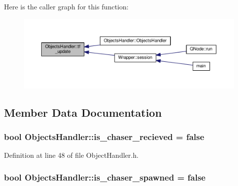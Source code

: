 Here is the caller graph for this function\+:
\nopagebreak
\begin{figure}[H]
\begin{center}
\leavevmode
\includegraphics[width=350pt]{class_objects_handler_a6896e4f9863bd1a4fbc8498d0cb20f09_icgraph}
\end{center}
\end{figure}




\subsection{Member Data Documentation}
\subsubsection[{\texorpdfstring{is\+\_\+chaser\+\_\+recieved}{is_chaser_recieved}}]{\setlength{\rightskip}{0pt plus 5cm}bool Objects\+Handler\+::is\+\_\+chaser\+\_\+recieved = false}\hypertarget{class_objects_handler_a86f8528ff5697c87fc6a3fcd6ba0f42c}{}\label{class_objects_handler_a86f8528ff5697c87fc6a3fcd6ba0f42c}


Definition at line 48 of file Object\+Handler.\+h.

\subsubsection[{\texorpdfstring{is\+\_\+chaser\+\_\+spawned}{is_chaser_spawned}}]{\setlength{\rightskip}{0pt plus 5cm}bool Objects\+Handler\+::is\+\_\+chaser\+\_\+spawned = false}\hypertarget{class_objects_handler_a16165ae7c0167ba8d2a0151a8a4fbfd5}{}\label{class_objects_handler_a16165ae7c0167ba8d2a0151a8a4fbfd5}


